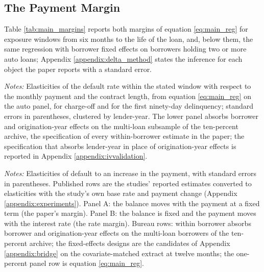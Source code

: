 \subsection{The Payment Margin}\label{sec:mainresults}

Table \ref{tab:main_margins} reports both margins of equation \eqref{eq:main_reg} for exposure windows from six months to the life of the loan, and, below them, the same regression with borrower fixed effects on borrowers holding two or more auto loans; Appendix \ref{appendix:delta_method} states the inference for each object the paper reports with a standard error.

\begin{table}[H]
\centering
\caption{The two margins of default by exposure window}
\label{tab:main_margins}
\small

\vspace{0.5em}
\begin{minipage}{0.92\textwidth}
\noindent \small \textit{Notes:} Elasticities of the default rate within the stated window with respect to the monthly payment and the contract length, from equation \eqref{eq:main_reg} on the auto panel, for charge-off and for the first ninety-day delinquency; standard errors in parentheses, clustered by lender-year. The lower panel absorbs borrower and origination-year effects on the multi-loan subsample of the ten-percent archive, the specification of every within-borrower estimate in the paper; the specification that absorbs lender-year in place of origination-year effects is reported in Appendix \ref{appendix:ivvalidation}.
\end{minipage}
\end{table}

\begin{table}[p]
\centering
\caption{Published payment responses beside the bureau's, by margin}
\label{tab:benchmark}
\footnotesize

\vspace{0.2em}
\begin{minipage}{0.95\textwidth}
\noindent \scriptsize \textit{Notes:} Elasticities of default to an increase in the payment, with standard errors in parentheses. Published rows are the studies' reported estimates converted to elasticities with the study's own base rate and payment change (Appendix \ref{appendix:experiments}). Panel A: the balance moves with the payment at a fixed term (the paper's margin). Panel B: the balance is fixed and the payment moves with the interest rate (the rate margin). Bureau rows: within borrower absorbs borrower and origination-year effects on the multi-loan borrowers of the ten-percent archive; the fixed-effects designs are the candidates of Appendix \ref{appendix:bridge} on the covariate-matched extract at twelve months; the one-percent panel row is equation \eqref{eq:main_reg}.
\end{minipage}
\end{table}

